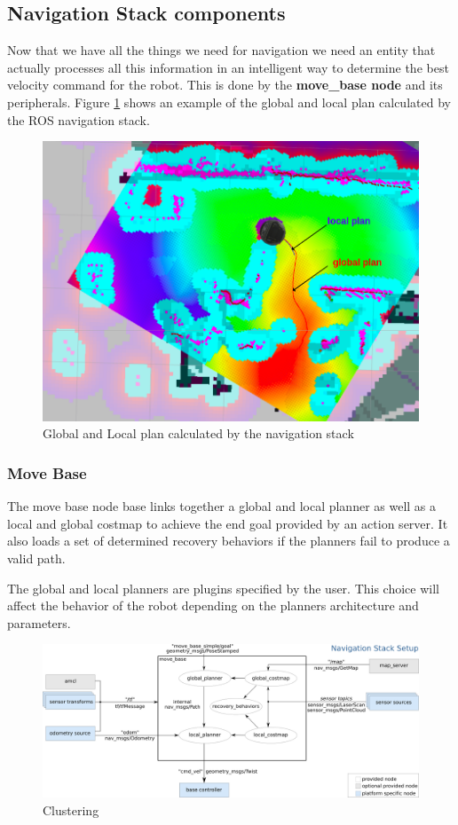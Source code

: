 \documentclass[12pt]{article}
\begin{document}
\subsection{Navigation Stack components}
Now that we have all the things we need for navigation we need an entity that actually processes all this information in an intelligent way to determine the best velocity command for the robot. This is done by the \textbf{move\_base node} and its peripherals.
Figure \ref{fig:plans} shows an example of the global and local plan calculated by the ROS navigation stack.
\begin{figure}[!htb]
    \centering
    \includegraphics[width=\linewidth]{rviz_navigation2.png}
    \caption{Global and Local plan calculated by the navigation stack}
    \label{fig:plans}
\end{figure}
\subsubsection{Move Base}

The move base node base links together a global and local planner as well as a local and global costmap to achieve the end goal provided by an action server. It also loads a set of determined recovery behaviors if the planners fail to produce a valid path. 

The global and local planners are plugins specified by the user. This choice will affect the behavior of the robot depending on the planners architecture and parameters. 
\begin{figure}[!htb]
    \centering
    \includegraphics[width=\linewidth]{overview_tf.png}
    \caption{Clustering}
    \label{fig:my_label}
\end{figure}
\end{document}
